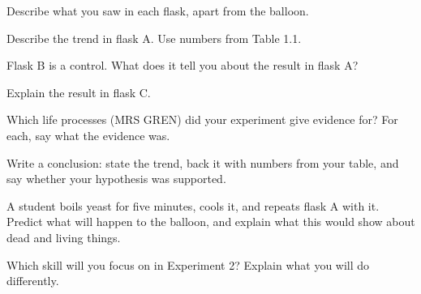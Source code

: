 \task Describe what you saw in each flask, apart from the balloon. 
\answerbox{4cm}


\task Describe the trend in flask A. Use numbers from Table 1.1. 
\answerbox{3.5cm}

\task Flask B is a control. What does it tell you about the result in flask A?
\answerbox{4cm}

\task Explain the result in flask C.
\answerbox{3.5cm}

\task Which life processes (MRS GREN) did your experiment give evidence for? For each, say what the evidence was.
\answerbox{5cm}

\task Write a conclusion: state the trend, back it with numbers from your table, and say whether your hypothesis was supported. 

\answerbox{5cm}

\begin{yr8box}
\begin{keepext}
\exttask A student boils yeast for five minutes, cools it, and repeats flask A with it. Predict what will happen to the balloon, and explain what this would show about dead and living things.
\answerbox{5cm}
\end{keepext}
\end{yr8box}


\begin{skillcheck}
\end{skillcheck}

\task Which skill will you focus on in Experiment 2? Explain what you will do differently.
\answerbox{5cm}
